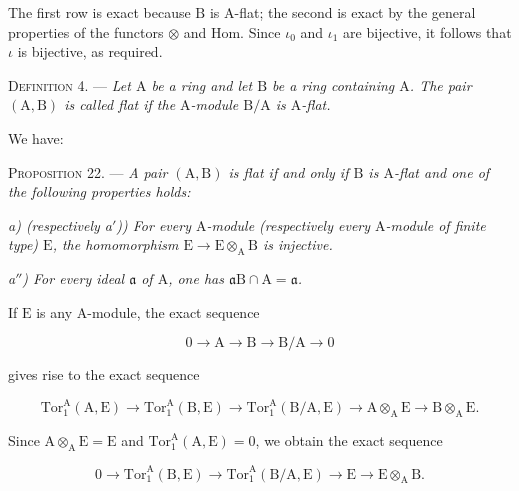 The first row is exact because $\mathrm{B}$ is $\mathrm{A}$-flat; the second is exact by the
general properties of the functors $\otimes$ and $\mathrm{Hom}$. Since
$\iota_0$ and $\iota_1$ are bijective, it follows that $\iota$ is bijective,
as required.


\textsc{Definition 4}. --- \emph{Let $\mathrm{A}$ be a ring and
let $\mathrm{B}$ be a ring containing $\mathrm{A}$. The pair $(\mathrm{A},\mathrm{B})$ is called flat if the
$\mathrm{A}$-module $\mathrm{B}/\mathrm{A}$ is $\mathrm{A}$-flat.}

We have:

\textsc{Proposition 22}. --- \emph{A pair $(\mathrm{A},\mathrm{B})$ is
flat if and only if $\mathrm{B}$ is $\mathrm{A}$-flat and one of the following properties
holds:}

\emph{a) (respectively a$'$)) For every
$\mathrm{A}$-module (respectively every $\mathrm{A}$-module of finite type) $\mathrm{E}$, the
homomorphism $\mathrm{E}\to \mathrm{E}\otimes_\mathrm{A}\mathrm{B}$ is injective.}

\emph{a$''$) For every ideal $\mathfrak{a}$
of $\mathrm{A}$, one has $\mathfrak{a}\mathrm{B}\cap \mathrm{A}=\mathfrak{a}$.}

If $\mathrm{E}$ is any $\mathrm{A}$-module, the exact sequence

\begin{equation*}
0\longrightarrow \mathrm{A}\longrightarrow \mathrm{B}\longrightarrow \mathrm{B}/\mathrm{A}\longrightarrow0
\end{equation*}

gives rise to the exact sequence

\begin{equation*}
\mathrm{Tor}_1^\mathrm{A}(\mathrm{A},\mathrm{E})\longrightarrow
\mathrm{Tor}_1^\mathrm{A}(\mathrm{B},\mathrm{E})\longrightarrow
\mathrm{Tor}_1^\mathrm{A}(\mathrm{B}/\mathrm{A},\mathrm{E})\longrightarrow
\mathrm{A}\otimes_\mathrm{A}\mathrm{E}\longrightarrow \mathrm{B}\otimes_\mathrm{A}\mathrm{E}.
\end{equation*}

Since $\mathrm{A}\otimes_\mathrm{A}\mathrm{E}=\mathrm{E}$ and $\mathrm{Tor}_1^\mathrm{A}(\mathrm{A},\mathrm{E})=0$, we obtain the exact
sequence

\begin{equation*}
0\longrightarrow\mathrm{Tor}_1^\mathrm{A}(\mathrm{B},\mathrm{E})\longrightarrow
\mathrm{Tor}_1^\mathrm{A}(\mathrm{B}/\mathrm{A},\mathrm{E})\longrightarrow \mathrm{E}\longrightarrow \mathrm{E}\otimes_\mathrm{A}\mathrm{B}.
\end{equation*}

